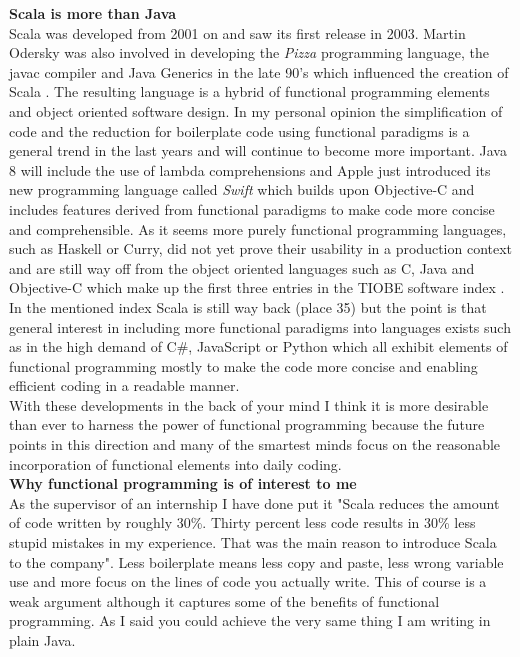 \documentclass[twoside, 11pt]{scrartcl}
\begin{document}
\textbf{Scala is more than Java}\\
Scala was developed from 2001 on and saw its first release in 2003. Martin Odersky was also involved in developing the \textit{Pizza} programming language, the javac compiler and Java Generics in the late 90's which influenced the creation of Scala \cite{link:scalaHistory}.
The resulting language is a hybrid of functional programming elements and object oriented software design. In my personal opinion the simplification of code and the reduction for boilerplate code using functional paradigms is a general trend in the last years and will continue to become more important. Java 8 will include the use of lambda comprehensions and Apple just introduced its new programming language called \textit{Swift} which builds upon Objective-C and includes features derived from functional paradigms to make code more concise and comprehensible. 
As it seems more purely functional programming languages, such as Haskell or Curry, did not yet prove their usability in a production context and are still way off from the object oriented languages such as C, Java and Objective-C which make up the first three entries in the TIOBE software index \cite{link:tiobeIndex}.
In the mentioned index Scala is still way back (place 35) but the point is that general interest in including more functional paradigms into languages exists such as in the high demand of C\#, JavaScript or Python which all exhibit elements of functional programming mostly to make the code more concise and enabling efficient coding in a readable manner.\\
With these developments in the back of your mind I think it is more desirable than ever to harness the power of functional programming because the future points in this direction and many of the smartest minds focus on the reasonable incorporation of functional elements into daily coding.\\

\textbf{Why functional programming is of interest to me}\\
As the supervisor of an internship I have done put it "Scala reduces the amount of code written by roughly 30\%. Thirty percent less code results in 30\% less stupid mistakes in my experience. That was the main reason to introduce Scala to the company". Less boilerplate means less copy and paste, less wrong variable use and more focus on the lines of code you actually write.
This of course is a weak argument although it captures some of the benefits of functional programming. As I said you could achieve the very same thing I am writing in plain Java.\\
\end{document}
